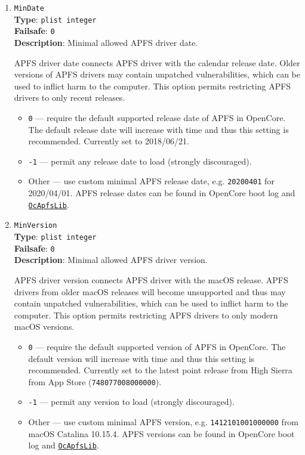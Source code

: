 \documentclass[]{article}
\providecommand{\tightlist}{%
  \setlength{\itemsep}{0pt}\setlength{\parskip}{0pt}}
\begin{document}
\begin{enumerate}
\item
  \texttt{MinDate}\\
  \textbf{Type}: \texttt{plist\ integer}\\
  \textbf{Failsafe}: \texttt{0}\\
  \textbf{Description}: Minimal allowed APFS driver date.

  APFS driver date connects APFS driver with the calendar
  release date. Older versions of APFS drivers may contain unpatched
  vulnerabilities, which can be used to inflict harm to the computer.
  This option permits restricting APFS drivers to only recent releases.

  \begin{itemize}
    \tightlist
    \item \texttt{0} --- require the default supported release date of APFS
    in OpenCore. The default release date will increase with time and thus
    this setting is recommended. Currently set to 2018/06/21.
    \item \texttt{-1} --- permit any release date to load (strongly discouraged).
    \item Other --- use custom minimal APFS release date, e.g. \texttt{20200401}
    for 2020/04/01. APFS release dates can be found in OpenCore boot log
    and \href{https://github.com/acidanthera/OpenCorePkg/blob/master/Include/Acidanthera/Library/OcApfsLib.h}{\texttt{OcApfsLib}}.
  \end{itemize}

\item
  \texttt{MinVersion}\\
  \textbf{Type}: \texttt{plist\ integer}\\
  \textbf{Failsafe}: \texttt{0}\\
  \textbf{Description}: Minimal allowed APFS driver version.

  APFS driver version connects APFS driver with the macOS
  release. APFS drivers from older macOS releases will become
  unsupported and thus may contain unpatched vulnerabilities, which
  can be used to inflict harm to the computer. This option permits
  restricting APFS drivers to only modern macOS versions.

  \begin{itemize}
    \tightlist
    \item \texttt{0} --- require the default supported version of APFS
    in OpenCore. The default version will increase with time and thus
    this setting is recommended. Currently set to the latest point release
    from High Sierra from App Store (\texttt{748077008000000}).
    \item \texttt{-1} --- permit any version to load (strongly discouraged).
    \item Other --- use custom minimal APFS version, e.g. \texttt{1412101001000000}
    from macOS Catalina 10.15.4. APFS versions can be found in OpenCore boot log
    and \href{https://github.com/acidanthera/OpenCorePkg/blob/master/Include/Acidanthera/Library/OcApfsLib.h}{\texttt{OcApfsLib}}.
  \end{itemize}

\end{enumerate}
\end{document}

